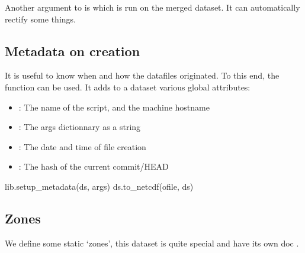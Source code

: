 Another argument to  is  which is run on the merged dataset.
It can automatically rectify some things.

\subsection{Metadata on creation}
It is useful to know when and how the datafiles originated.
To this end, the function  can be used.
It adds to a dataset various global attributes:
\begin{itemize}
  \item {}: The name of the script, and the machine hostname
  \item {}: The args dictionnary as a string
  \item {}: The date and time of file creation
  \item {}: The hash of the current commit/HEAD
\end{itemize}

\begin{python}
lib.setup_metadata(ds, args)
ds.to_netcdf(ofile, ds)
\end{python}

\subsection{Zones}
We define some static `zones', this dataset is quite special and have its own doc .

